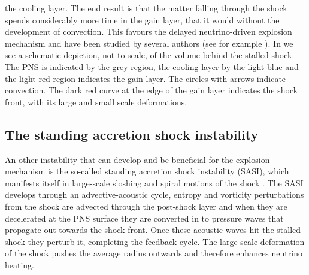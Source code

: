the cooling layer. The end result is that the matter falling through the shock spends considerably more time
in the gain layer, that it would without the development of convection.
This favours the delayed neutrino-driven explosion mechanism and have been studied by several authors
(see for example \cite{herant_94,burrows_95,janka_96,foglizzo_06,mueller_12a}).
In  we see a schematic depiction, not to scale, of
the volume behind the stalled shock. The PNS is indicated by the grey region, the cooling layer by the light blue and
the light red region indicates the gain layer. The circles with arrows indicate convection. The dark red curve
at the edge of the gain layer indicates the shock front, with its large and small scale deformations.

\subsection{The standing accretion shock instability}
An other instability that can develop and be beneficial for the explosion mechanism is 
the so-called standing accretion shock instability (SASI), which manifests itself in large-scale 
sloshing and spiral motions of the shock \citep{blondin_03,blondin_06,foglizzo_07,ohnishi_06,ohnishi_08,scheck_08,guilet_12,foglizzo_15}.
The SASI develops through an advective-acoustic cycle, entropy and vorticity perturbations from the shock are advected through the
post-shock layer and when they are decelerated at the PNS surface they are converted in to pressure waves that propagate
out towards the shock front. Once these acoustic waves hit the stalled shock they perturb it, completing the feedback
cycle. The large-scale deformation of the shock pushes the average radius outwards and therefore enhances neutrino heating.
 
